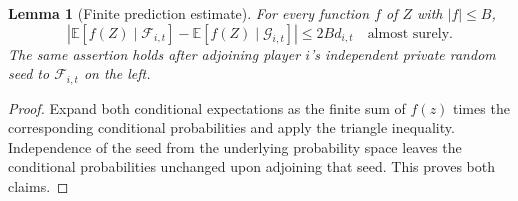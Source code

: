 \documentclass[11pt]{article}
\newtheorem{lemma}[theorem]{Lemma}
\theoremstyle{remark}\newtheorem{remark}[theorem]{Remark}
\newcommand{\E}{\mathbb E}
\begin{document}
\begin{lemma}[Finite prediction estimate]\label{lem:prediction}
For every function $f$ of $Z$ with $|f|\leq B$,
\[
 \left|\E[f(Z)\mid\mathcal F_{i,t}]
       -\E[f(Z)\mid\mathcal G_{i,t}]\right|\leq2B d_{i,t}
 \quad\text{almost surely}.                                   \tag{2}
\]
The same assertion holds after adjoining player $i$'s independent private random seed to $\mathcal F_{i,t}$ on the left.
\end{lemma}
\begin{proof}
Expand both conditional expectations as the finite sum of $f(z)$ times the corresponding conditional probabilities and apply the triangle inequality. Independence of the seed from the underlying probability space leaves the conditional probabilities unchanged upon adjoining that seed. This proves both claims.
\end{proof}
\end{document}
